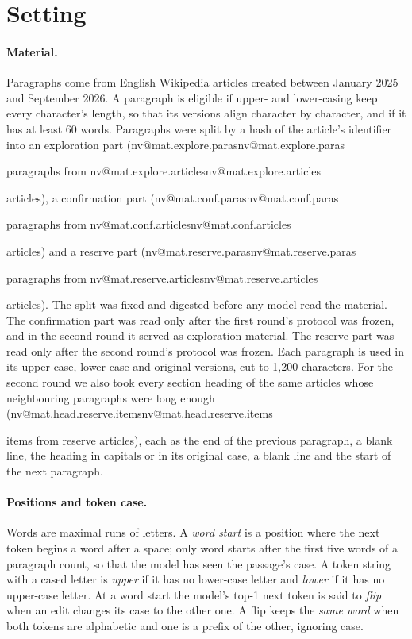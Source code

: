 \documentclass[11pt]{article}
\makeatletter
\newcommand{\nv}[1]{\ifcsname nv@#1\endcsname\csname nv@#1\endcsname\else\PackageError{numbers}{Unknown number key #1}{}\fi}
\makeatother
\begin{document}
\section{Setting}
\label{sec:setting}

\paragraph{Material.} Paragraphs come from English Wikipedia articles created between January 2025 and September 2026. A paragraph is eligible if upper- and lower-casing keep every character's length, so that its versions align character by character, and if it has at least 60 words. Paragraphs were split by a hash of the article's identifier into an exploration part (\nv{mat.explore.paras} paragraphs from \nv{mat.explore.articles} articles), a confirmation part (\nv{mat.conf.paras} paragraphs from \nv{mat.conf.articles} articles) and a reserve part (\nv{mat.reserve.paras} paragraphs from \nv{mat.reserve.articles} articles). The split was fixed and digested before any model read the material. The confirmation part was read only after the first round's protocol was frozen, and in the second round it served as exploration material. The reserve part was read only after the second round's protocol was frozen. Each paragraph is used in its upper-case, lower-case and original versions, cut to 1{,}200 characters. For the second round we also took every section heading of the same articles whose neighbouring paragraphs were long enough (\nv{mat.head.reserve.items} items from reserve articles), each as the end of the previous paragraph, a blank line, the heading in capitals or in its original case, a blank line and the start of the next paragraph.

\paragraph{Positions and token case.} Words are maximal runs of letters. A \emph{word start} is a position where the next token begins a word after a space; only word starts after the first five words of a paragraph count, so that the model has seen the passage's case. A token string with a cased letter is \emph{upper} if it has no lower-case letter and \emph{lower} if it has no upper-case letter. At a word start the model's top-1 next token is said to \emph{flip} when an edit changes its case to the other one. A flip keeps the \emph{same word} when both tokens are alphabetic and one is a prefix of the other, ignoring case.
\end{document}
